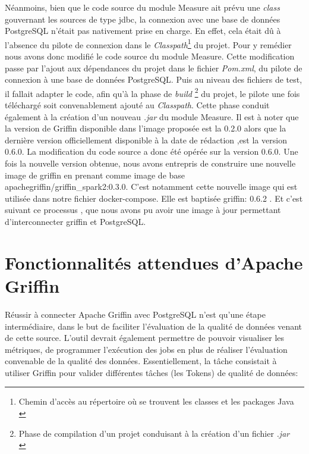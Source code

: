 N\'eanmoins, bien que le code source du module Measure ait pr\'evu une \textit{class} gouvernant les sources de type \acrshort{jdbc}, la connexion avec une base de donn\'ees PostgreSQL n'\'etait pas nativement prise en charge. En effet, cela \'etait d\^u \`a l'absence du pilote de connexion dans le \textit{Classpath}\footnote{Chemin d'accès au répertoire où se trouvent les classes et les packages Java \\} du projet. Pour y rem\'edier nous avons donc modifi\'e le code source du module Measure. Cette modification passe par l'ajout aux d\'ependances du projet dans le fichier \emph{Pom.xml}, du pilote de connexion \`a une base de donn\'ees PostgreSQL. Puis au niveau des fichiers de test, il fallait adapter le code, afin qu'\`a la phase de \textit{build} \footnote{Phase de compilation d'un projet conduisant \`a la cr\'eation d'un fichier \textit{.jar} \\} du projet, le pilote une fois t\'el\'echarg\'e soit convenablement ajout\'e au \textit{Classpath}. Cette phase conduit \'egalement \`a la cr\'eation d'un nouveau \textit{.jar} du module Measure. Il est \`a noter que la version de Griffin disponible dans l'image propos\'ee est la 0.2.0 alors que la derni\`ere version officiellement disponible \`a la date de r\'edaction ,est la version 0.6.0. La modification du code source a donc \'et\'e op\'er\'ee sur la version 0.6.0. Une fois la nouvelle version obtenue, nous avons entrepris de construire une nouvelle image de griffin en prenant comme image de base apachegriffin/griffin\_spark2:0.3.0. C'est notamment cette nouvelle image qui est utilis\'ee dans notre fichier docker-compose. Elle est baptis\'ee griffin: 0.6.2 . Et c'est suivant ce processus \cite{ApacheGriffinDocDockerDevEnvBuild}, que nous avons pu avoir une image \`a jour permettant d'interconnecter griffin et PostgreSQL.

\section{Fonctionnalit\'es attendues d'Apache Griffin}
\label{sec:TestGriffin}


R\'eussir \`a connecter Apache Griffin avec PostgreSQL n'est qu'une \'etape interm\'ediaire, dans le but de faciliter l'\'evaluation de la qualit\'e de donn\'ees venant de cette source. L'outil devrait également permettre de pouvoir visualiser les métriques, de programmer l'exécution des jobs en plus de r\'ealiser l'\'evaluation convenable de la qualit\'e des donn\'ees. Essentiellement, la t\^ache consistait \`a utiliser Griffin pour valider diff\'erentes t\^aches (les Tokens) de qualit\'e de donn\'ees:

